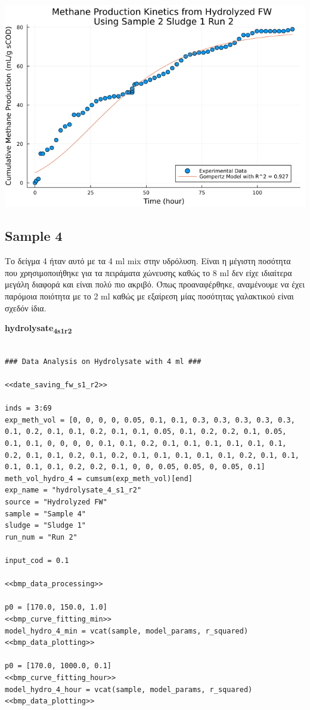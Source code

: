 \documentclass[11pt]{article}
\begin{document}
\begin{center}
\includegraphics[width=.9\linewidth]{../plots/BMPs/Hydrolyzed FW/methane_kinetics_hydrolysate_2_s1_r2_hour.png}
\end{center}

\subsection{Sample 4}
\label{sec:org690957a}
Το δείγμα 4 ήταν αυτό με τα 4 ml mix στην υδρόλυση. Είναι η μέγιστη ποσότητα που χρησιμοποιήθηκε για τα πειράματα χώνευσης καθώς το 8 ml δεν είχε ιδιαίτερα μεγάλη διαφορά και είναι πολύ πιο ακριβό. Όπως προαναφέρθηκε, αναμένουμε να έχει παρόμοια ποιότητα με το 2 ml καθώς με εξαίρεση μίας ποσότητας γαλακτικού είναι σχεδόν ίδια.

\textbf{hydrolysate\textsubscript{4}\textsubscript{s1}\textsubscript{r2}}
\begin{verbatim}

### Data Analysis on Hydrolysate with 4 ml ###

<<date_saving_fw_s1_r2>>

inds = 3:69
exp_meth_vol = [0, 0, 0, 0, 0.05, 0.1, 0.1, 0.3, 0.3, 0.3, 0.3, 0.3, 0.1, 0.2, 0.1, 0.1, 0.2, 0.1, 0.1, 0.05, 0.1, 0.2, 0.2, 0.1, 0.05, 0.1, 0.1, 0, 0, 0, 0, 0.1, 0.1, 0.2, 0.1, 0.1, 0.1, 0.1, 0.1, 0.1, 0.2, 0.1, 0.1, 0.2, 0.1, 0.2, 0.1, 0.1, 0.1, 0.1, 0.1, 0.2, 0.1, 0.1, 0.1, 0.1, 0.1, 0.2, 0.2, 0.1, 0, 0, 0.05, 0.05, 0, 0.05, 0.1]
meth_vol_hydro_4 = cumsum(exp_meth_vol)[end]
exp_name = "hydrolysate_4_s1_r2"
source = "Hydrolyzed FW"
sample = "Sample 4"
sludge = "Sludge 1"
run_num = "Run 2"

input_cod = 0.1

<<bmp_data_processing>>

p0 = [170.0, 150.0, 1.0]
<<bmp_curve_fitting_min>>
model_hydro_4_min = vcat(sample, model_params, r_squared)
<<bmp_data_plotting>>

p0 = [170.0, 1000.0, 0.1]
<<bmp_curve_fitting_hour>>
model_hydro_4_hour = vcat(sample, model_params, r_squared)
<<bmp_data_plotting>>
\end{verbatim}
\end{document}
